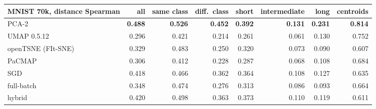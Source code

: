\begin{tabular}{lrrrrrrr}
\toprule
MNIST 70k, distance Spearman & all & same class & diff.\ class & short & intermediate & long & centroids \\
\midrule
PCA-2 & \textbf{0.488} & \textbf{0.526} & \textbf{0.452} & \textbf{0.392} & \textbf{0.131} & \textbf{0.231} & \textbf{0.814} \\
UMAP 0.5.12 & 0.296 & 0.421 & 0.214 & 0.261 & 0.061 & 0.130 & 0.752 \\
openTSNE (FIt-SNE) & 0.329 & 0.483 & 0.250 & 0.320 & 0.073 & 0.090 & 0.607 \\
PaCMAP & 0.306 & 0.412 & 0.228 & 0.287 & 0.068 & 0.108 & 0.684 \\
\magnet{} SGD & 0.418 & 0.466 & 0.362 & 0.364 & 0.108 & 0.127 & 0.635 \\
\magnet{} full-batch & 0.348 & 0.474 & 0.276 & 0.313 & 0.086 & 0.093 & 0.664 \\
\magnet{} hybrid & 0.420 & 0.498 & 0.363 & 0.373 & 0.110 & 0.119 & 0.611 \\
\bottomrule
\end{tabular}
